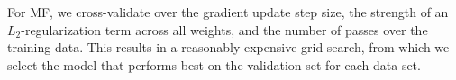 For MF, we cross-validate over the gradient update step size, the
strength of an $L_2$-regularization term across all weights, and the
number of passes over the training data. This results in a reasonably
expensive grid search, from which we select
the model that performs best on the validation set for each data set.






